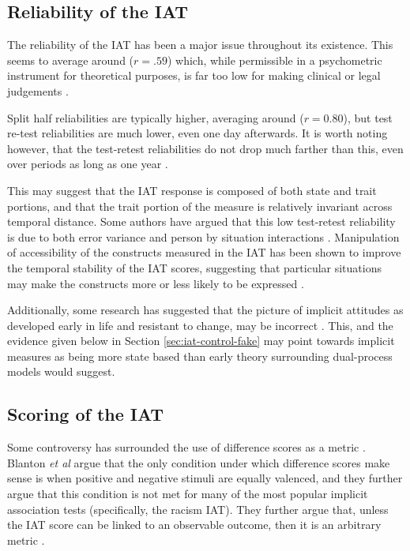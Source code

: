 \subsection{Reliability of the IAT}
\label{sec:reliability-iat}

The reliability of the IAT has been a major issue throughout its existence. This seems to average around ($r=.59$) which, while permissible in a psychometric instrument for theoretical purposes, is far too low for making clinical or legal judgements \cite{Greenwald2000, Blanton2006d}. 

Split half reliabilities are typically higher, averaging around ($r=0.80$), but test re-test reliabilities are much lower, even one day afterwards. It is worth noting however, that the test-retest reliabilities do not drop much farther than this, even over periods as long as one year \cite{Egloff2005}. 

This may suggest that the IAT response is composed of both state and trait portions, and that the trait portion of the measure is relatively invariant across temporal distance. Some authors have argued that this low test-retest reliability is due to both error variance and person by situation interactions \cite{Gschwendner2008}.  Manipulation of accessibility of the constructs measured in the IAT has been shown to improve the temporal stability of the IAT scores, suggesting that particular situations may make the constructs more or less likely to be expressed \cite{Gschwendner2008}. 

Additionally, some research has suggested that the picture of implicit attitudes as developed early in life and resistant to change, may be incorrect \cite{Gschwendner2008}. This, and the evidence given below in Section \ref{sec:iat-control-fake} may point towards implicit measures as being more state based than early theory surrounding dual-process models would suggest. 

\subsection{Scoring of the IAT}
\label{sec:scoring-iat}



Some controversy has surrounded the use of difference scores as a metric \cite{Blanton2006d}. Blanton \textit{et al} argue that the only condition under which difference scores make sense is when positive and negative stimuli are equally valenced, and they further argue that this condition is not met for many of the most popular implicit association tests (specifically, the racism IAT). They further argue that, unless the IAT score can be linked to an observable outcome, then it is an arbitrary metric \cite{Blanton2006}.

